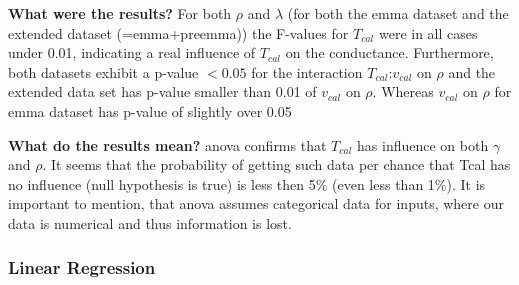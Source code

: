 \textbf{What were the results?}
For both $\rho$ and $\lambda$ (for both the \gls{emma} dataset and the extended dataset (=\gls{emma}+pre\gls{emma})) 
the F-values for $T_{cal}$ were in all cases under 0.01, 
indicating a real influence of $T_{cal}$ on the conductance.
Furthermore, both datasets exhibit a p-value $< 0.05$ for the interaction $T_{cal}$:$v_{cal}$ on $\rho$
and the extended data set has p-value smaller than 0.01 of $v_{cal}$ on $\rho$. 
Whereas $v_{cal}$ on $\rho$ for \gls{emma} dataset has p-value of slightly over 0.05

\textbf{What do the results mean?} 
\Gls{anova} confirms that $T_{cal}$ has influence on both $\gamma$ and $\rho$. 
It seems that the probability of getting such data per chance that Tcal has no influence 
(null hypothesis is true) is less then 5\% (even less than 1\%). 
It is important to mention, that \gls{anova} assumes categorical data for inputs, 
where our data is numerical and thus information is lost. 


\subsubsection{Linear Regression} 

